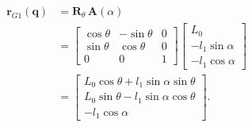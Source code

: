\begin{equation}
    \begin{aligned}
        \mathbf{r}_{G1}(\mathbf{q}) &= \mathbf{R}_\theta\,\mathbf{A}(\alpha) \\[3pt]
        &= \begin{bmatrix}
            \cos\theta & -\sin\theta & 0 \\
            \sin\theta & \cos\theta & 0 \\
            0 & 0 & 1
        \end{bmatrix}
        \begin{bmatrix}
            L_0 \\ -l_1\sin\alpha \\ -l_1\cos\alpha
        \end{bmatrix} \\[3pt]
        &= \begin{bmatrix}
            L_0\cos\theta + l_1\sin\alpha\sin\theta \\
            L_0\sin\theta - l_1\sin\alpha\cos\theta \\
            -l_1\cos\alpha
        \end{bmatrix}.
    \end{aligned}
    \label{eq:pos_g1}
\end{equation}

